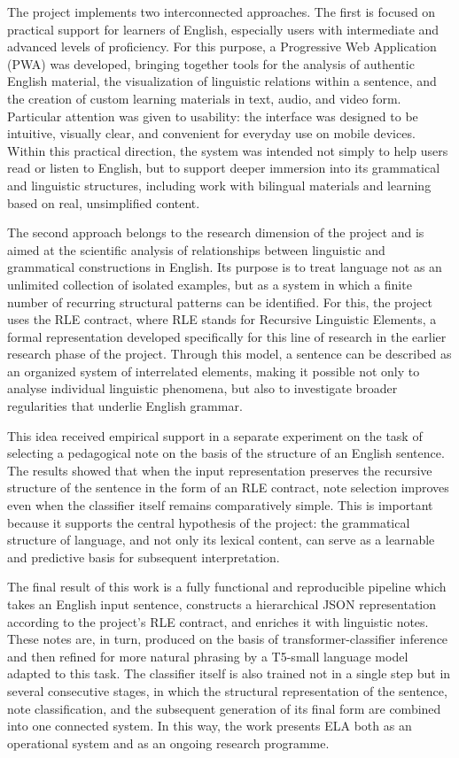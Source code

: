 \documentclass[12pt,a4paper,oneside]{report}
\begin{document}
The project implements two interconnected approaches. The first is focused on practical support for learners of English, especially users with intermediate and advanced levels of proficiency. For this purpose, a Progressive Web Application (PWA) was developed, bringing together tools for the analysis of authentic English material, the visualization of linguistic relations within a sentence, and the creation of custom learning materials in text, audio, and video form. Particular attention was given to usability: the interface was designed to be intuitive, visually clear, and convenient for everyday use on mobile devices. Within this practical direction, the system was intended not simply to help users read or listen to English, but to support deeper immersion into its grammatical and linguistic structures, including work with bilingual materials and learning based on real, unsimplified content.

The second approach belongs to the research dimension of the project and is aimed at the scientific analysis of relationships between linguistic and grammatical constructions in English. Its purpose is to treat language not as an unlimited collection of isolated examples, but as a system in which a finite number of recurring structural patterns can be identified. For this, the project uses the RLE contract, where RLE stands for Recursive Linguistic Elements, a formal representation developed specifically for this line of research in the earlier research phase of the project. Through this model, a sentence can be described as an organized system of interrelated elements, making it possible not only to analyse individual linguistic phenomena, but also to investigate broader regularities that underlie English grammar.

This idea received empirical support in a separate experiment on the task of selecting a pedagogical note on the basis of the structure of an English sentence. The results showed that when the input representation preserves the recursive structure of the sentence in the form of an RLE contract, note selection improves even when the classifier itself remains comparatively simple. This is important because it supports the central hypothesis of the project: the grammatical structure of language, and not only its lexical content, can serve as a learnable and predictive basis for subsequent interpretation.

The final result of this work is a fully functional and reproducible pipeline which takes an English input sentence, constructs a hierarchical JSON representation according to the project's RLE contract, and enriches it with linguistic notes. These notes are, in turn, produced on the basis of transformer-classifier inference and then refined for more natural phrasing by a T5-small language model adapted to this task. The classifier itself is also trained not in a single step but in several consecutive stages, in which the structural representation of the sentence, note classification, and the subsequent generation of its final form are combined into one connected system. In this way, the work presents ELA both as an operational system and as an ongoing research programme.
\end{document}
